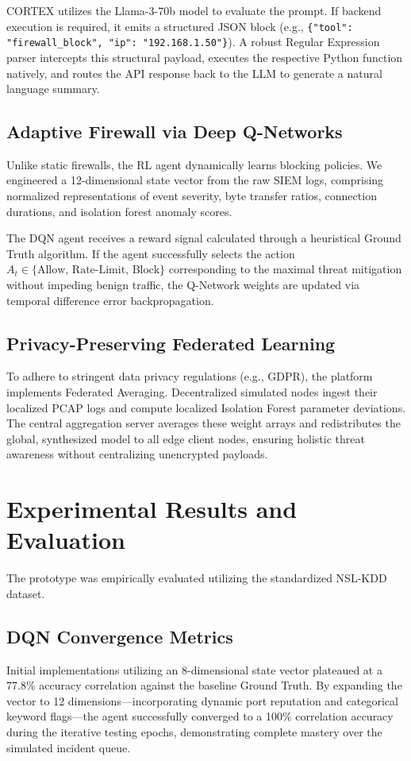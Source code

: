 \documentclass[conference]{IEEEtran}
\begin{document}
CORTEX utilizes the Llama-3-70b model to evaluate the prompt. If backend execution is required, it emits a structured JSON block (e.g., \texttt{\{"tool": "firewall\_block", "ip": "192.168.1.50"\}}). A robust Regular Expression parser intercepts this structural payload, executes the respective Python function natively, and routes the API response back to the LLM to generate a natural language summary.

\subsection{Adaptive Firewall via Deep Q-Networks}
Unlike static firewalls, the RL agent dynamically learns blocking policies. We engineered a 12-dimensional state vector from the raw SIEM logs, comprising normalized representations of event severity, byte transfer ratios, connection durations, and isolation forest anomaly scores.

The DQN agent receives a reward signal calculated through a heuristical Ground Truth algorithm. If the agent successfully selects the action $A_t \in \{\text{Allow, Rate-Limit, Block}\}$ corresponding to the maximal threat mitigation without impeding benign traffic, the Q-Network weights are updated via temporal difference error backpropagation.

\subsection{Privacy-Preserving Federated Learning}
To adhere to stringent data privacy regulations (e.g., GDPR), the platform implements Federated Averaging. Decentralized simulated nodes ingest their localized PCAP logs and compute localized Isolation Forest parameter deviations. The central aggregation server averages these weight arrays and redistributes the global, synthesized model to all edge client nodes, ensuring holistic threat awareness without centralizing unencrypted payloads.

\section{Experimental Results and Evaluation}
The prototype was empirically evaluated utilizing the standardized NSL-KDD dataset.

\subsection{DQN Convergence Metrics}
Initial implementations utilizing an 8-dimensional state vector plateaued at a 77.8\% accuracy correlation against the baseline Ground Truth. By expanding the vector to 12 dimensions—incorporating dynamic port reputation and categorical keyword flags—the agent successfully converged to a 100\% correlation accuracy during the iterative testing epochs, demonstrating complete mastery over the simulated incident queue.
\end{document}
